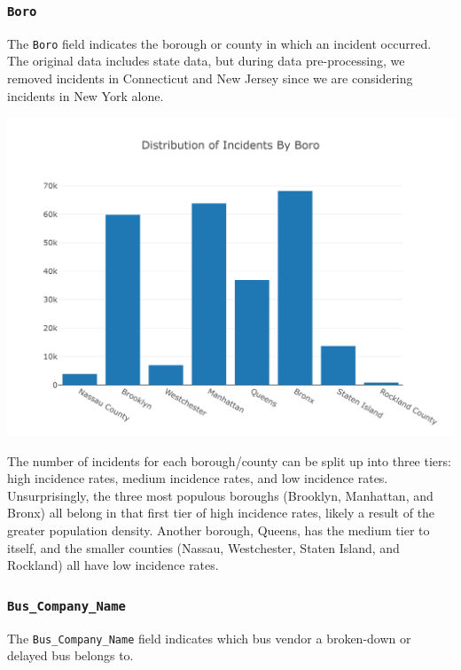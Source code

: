 \documentclass[11pt]{article}
\begin{document}
\subsubsection{\texttt{Boro}}
The \texttt{Boro} field indicates the borough or county in which an incident occurred. The original data includes state data, but during data pre-processing, we removed incidents in Connecticut and New Jersey since we are considering incidents in New York alone.
\begin{center}
\includegraphics[width=5.25in]{images/boro.png}
\end{center}
The number of incidents for each borough/county can be split up into three tiers: high incidence rates, medium incidence rates, and low incidence rates. Unsurprisingly, the three most populous boroughs (Brooklyn, Manhattan, and Bronx) all belong in that first tier of high incidence rates, likely a result of the greater population density. Another borough, Queens, has the medium tier to itself, and the smaller counties (Nassau, Westchester, Staten Island, and Rockland) all have low incidence rates.

\subsubsection{\texttt{Bus\_Company\_Name}}
The \texttt{Bus\_Company\_Name} field indicates which bus vendor a broken-down or delayed bus belongs to.
\end{document}
